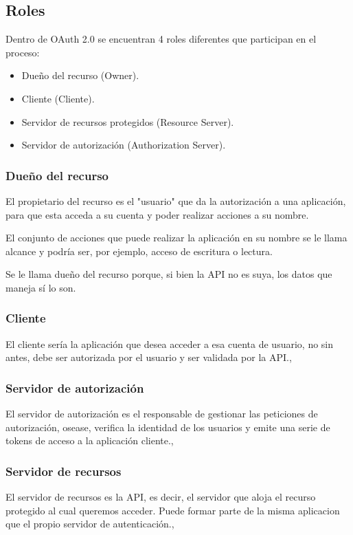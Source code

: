 \subsection{Roles}
Dentro de OAuth 2.0 se encuentran 4 roles diferentes que participan en el proceso:
\begin{itemize}
    \item Dueño del recurso (Owner).
    \item Cliente (Cliente).
    \item Servidor de recursos protegidos (Resource Server).
    \item Servidor de autorización (Authorization Server).
\end{itemize}

\subsubsection{Dueño del recurso}
El propietario del recurso es el "usuario" que da la autorización a una aplicación, para que esta acceda a su cuenta y poder realizar acciones a su nombre. \cite{Magana2020}

El conjunto de acciones que puede realizar la aplicación en su nombre se le llama alcance y podría ser, por ejemplo, acceso de escritura o lectura.

Se le llama dueño del recurso porque, si bien la API no es suya, los datos que maneja sí lo son.

\subsubsection{Cliente}
El cliente sería la aplicación que desea acceder a esa cuenta de usuario, no sin antes, debe ser autorizada por el usuario y ser validada por la API.\cite{Anicas2018},

\subsubsection{Servidor de autorización}
El servidor de autorización es el responsable de gestionar las peticiones de autorización, osease, verifica la identidad de los usuarios y emite una serie de tokens de acceso a la aplicación cliente.\cite{Anicas2018},

\subsubsection{Servidor de recursos}
El servidor de recursos es la API, es decir, el servidor que aloja el recurso protegido al cual queremos acceder. Puede formar parte de la misma aplicacion que el propio servidor de autenticación.\cite{Anicas2018},

